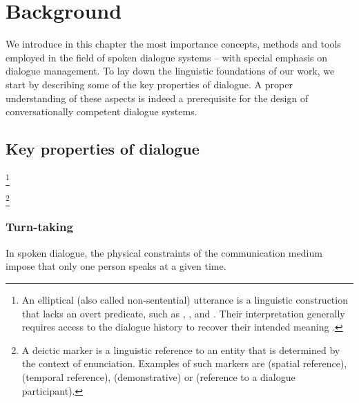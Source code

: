 
\chapter{Background}
\label{chap:background}

We introduce in this chapter the most importance concepts, methods and tools employed in the field of spoken dialogue systems -- with special emphasis on dialogue management.  To lay down the linguistic foundations of our work, we start by describing some of the key properties of dialogue.  A proper understanding of these aspects is indeed a prerequisite for the design of 
conversationally competent dialogue systems.

\section{Key properties of dialogue}


\footnote{An elliptical (also called non-sentential) utterance is a linguistic construction that lacks an overt predicate, such as , ,  and . Their interpretation generally requires access to the dialogue history to recover their intended meaning \citep{Fernandez:2007}.}

\footnote{A deictic marker is a linguistic reference to an entity that is determined by the context of enunciation.  Examples of such markers are  (spatial reference),  (temporal reference),  (demonstrative) or  (reference to a dialogue participant).}

\subsection{Turn-taking}

In spoken dialogue, the physical constraints of the communication medium impose that only one person speaks at a given time.






